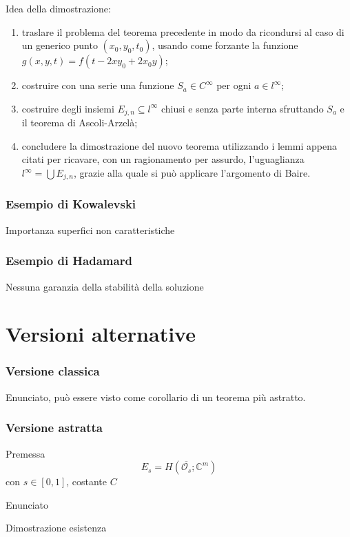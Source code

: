 \documentclass[serif,notheorems]{beamer}
\theoremstyle{definition} %
\theoremstyle{remark}
\begin{document}
\begin{frame}
Idea della dimostrazione:
\begin{enumerate}
\item
traslare il problema del teorema precedente in modo da ricondursi al caso di un generico punto $(x_0,y_0,t_0)$, usando come forzante la funzione $g(x,y,t)=f(t-2xy_0+2x_0y)$;
\item
costruire con una serie una funzione $S_a \in C^\infty$ per ogni $a \in l^\infty$;
\item
costruire degli insiemi $E_{j,n} \subseteq l^\infty$ chiusi e senza parte interna sfruttando $S_a$ e il teorema di Ascoli-Arzelà;
\item
concludere la dimostrazione del nuovo teorema utilizzando i lemmi appena citati per ricavare, con un ragionamento per assurdo, l'uguaglianza $l^\infty = \bigcup E_{j,n}$, grazie alla quale si può applicare l'argomento di Baire.
\end{enumerate}
\end{frame}

\begin{frame}
\frametitle{Esempio di Kowalevski}
Importanza superfici non caratteristiche
\end{frame}

\begin{frame}
\frametitle{Esempio di Hadamard}
Nessuna garanzia della stabilità della soluzione
\end{frame}



\section{Versioni alternative}

\begin{frame}
\frametitle{Versione classica}
Enunciato, può essere visto come corollario di un teorema più astratto.
\end{frame}

\begin{frame}
\frametitle{Versione astratta}
Premessa $$E_s = H(\overline{\mathcal{O}_s}; \mathbb{C}^m)$$ con $s \in [0,1]$, costante $C$
\end{frame}

\begin{frame}
Enunciato
\end{frame}

\begin{frame}
Dimostrazione esistenza
\end{frame}
\end{document}

